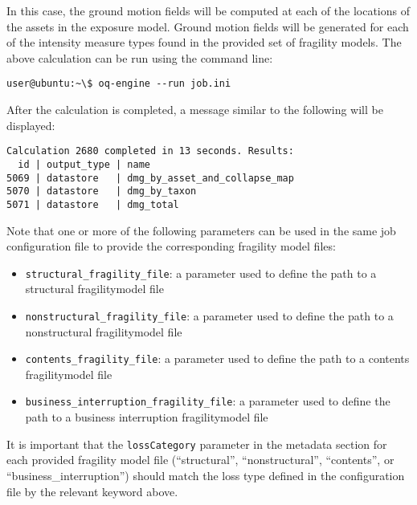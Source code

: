 In this case, the ground motion fields will be computed at each of the
locations of the assets in the exposure model. Ground motion fields will be
generated for each of the intensity measure types found in the provided set of
fragility models. The above calculation can be run using the command line:

\begin{verbatim}
user@ubuntu:~\$ oq-engine --run job.ini
\end{verbatim}

After the calculation is completed, a message similar to the following will be
displayed:

\begin{verbatim}
Calculation 2680 completed in 13 seconds. Results:
  id | output_type | name
5069 | datastore   | dmg_by_asset_and_collapse_map
5070 | datastore   | dmg_by_taxon
5071 | datastore   | dmg_total
\end{verbatim}

Note that one or more of the following parameters can be used in the same job
configuration file to provide the corresponding fragility model files:

\begin{itemize}

  \item \Verb+structural_fragility_file+: a parameter used to define the path
    to a structural \gls{fragilitymodel} file

  \item \Verb+nonstructural_fragility_file+: a parameter used to define the path
    to a nonstructural \gls{fragilitymodel} file

  \item \Verb+contents_fragility_file+: a parameter used to define the path
    to a contents \gls{fragilitymodel} file

  \item \Verb+business_interruption_fragility_file+: a parameter used to define
    the path to a business interruption \gls{fragilitymodel} file

\end{itemize}

It is important that the \Verb+lossCategory+ parameter in the metadata section
for each provided fragility model file (``structural'', ``nonstructural'',
``contents'', or ``business\_interruption'') should match the loss type
defined in the configuration file by the relevant keyword above.


